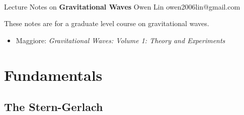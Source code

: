\documentclass[11pt]{article}
\begin{document}
\thispagestyle{empty}
\bigskip \
\vspace{0.1cm}

\begin{center}
{\fontsize{22}{22} \selectfont Lecture Notes on}
\vskip 16pt
{\fontsize{36}{36} \selectfont \bf \sffamily Gravitational Waves}
\vskip 24pt
{\fontsize{18}{18} \selectfont \rmfamily Owen Lin} 
\vskip 6pt
{\fontsize{14}{14} \selectfont \ttfamily owen2006lin@gmail.com} 
\vskip 24pt
\end{center}

{\parindent0pt \baselineskip=15.5pt
These notes are for a graduate level course on gravitational waves.
\begin{itemize}
    \item Maggiore: \textit{Gravitational Waves: Volume 1: Theory and Experiments}
\end{itemize}

}
 


\newpage
\microtoc
\newpage

\section{Fundamentals}
\subsection{The Stern-Gerlach}
\end{document}
